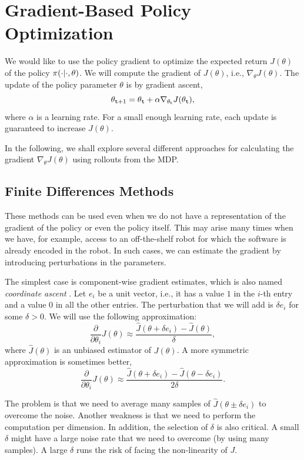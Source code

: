 \section{Gradient-Based Policy Optimization}
We would like to use the policy gradient to optimize the expected
return  $J(\theta)$ of the policy $\pi(\cdot|\cdot,\theta)$. We
will compute the gradient of $J(\theta)$, i.e., $\nabla_\theta
J(\theta)$. The update of the policy parameter $\theta$ is by gradient ascent,
\[
\theta_{{\tt t}+1}=\theta_{\tt t} + \alpha \nabla_{\theta_{\tt t}}
J(\theta_{\tt t}),
\]
where $\alpha$ is a learning rate. For a small enough learning rate, each update is guaranteed to increase $J(\theta)$.

In the following, we shall explore several different approaches for calculating the gradient $\nabla_{\theta} J(\theta)$ using rollouts from the MDP.




\subsection{Finite Differences Methods}

These methods can be used even when we do not have a representation
of the gradient of the policy or even the policy itself. This may
arise many times when we have, for example, access to an
off-the-shelf robot for which the software is already encoded in the
robot. In such cases, we can estimate the gradient by introducing
perturbations in the parameters.

The simplest case is component-wise gradient estimates, which is also named \emph{coordinate ascent} . Let $e_i$ be
a unit vector, i.e., it has a value $1$ in the $i$-th entry and a value
$0$ in all the other entries. The perturbation that we will add is
$\delta e_i$ for some $\delta >0$. We will use the following
approximation:
\[
\frac{\partial}{\partial \theta_i}J(\theta)\approx
\frac{\hat{J}(\theta+\delta e_i)-\hat{J}(\theta)}{\delta},
\]
where $\hat{J}(\theta)$ is an unbiased estimator of $J(\theta)$. A more
symmetric approximation is sometimes better,
\[
\frac{\partial}{\partial \theta_i}J(\theta)\approx
\frac{\hat{J}(\theta+\delta e_i)-\hat{J}(\theta-\delta e_i
)}{2\delta}.
\]

The problem is that we need to average many samples of
$\hat{J}(\theta\pm\delta e_i)$ to overcome the noise. Another
weakness is that we need to perform the computation per dimension. In
addition, the selection of $\delta$ is also critical. A small
$\delta$ might have a large noise rate that we need to overcome (by
using many samples). A large $\delta$ runs the risk of facing the
non-linearity of $J$.

